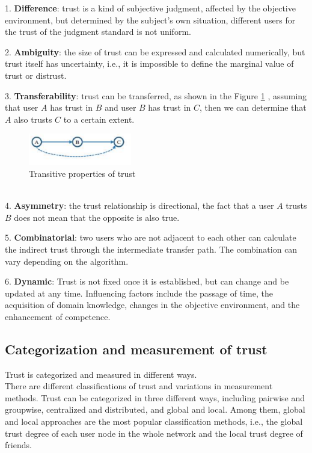 1.
\textbf{Difference}:
trust is a kind of subjective judgment, affected by the objective environment, but 
determined by the subject's own situation, different users for the trust of the judgment 
standard is not uniform\cite{b15}.

2.
\textbf{Ambiguity}:
the size of trust can be expressed and calculated numerically, but trust itself has 
uncertainty, i.e., it is impossible to define the marginal value of trust or distrust\cite{b15}.

3.
\textbf{Transferability}:
trust can be transferred, as shown in the Figure \ref{Fig.2: Transitive properties of trust}
, assuming that user $A$ has 
trust in $B$ and user $B$ has trust in $C$, then we can determine that $A$ also trusts 
$C$ to a certain extent\cite{b15}.

\begin{figure}[H] %
    \centering %
    \includegraphics[width=0.4\textwidth]{figures/relation.png} %
    \caption{Transitive properties of trust} %
    \label{Fig.2: Transitive properties of trust} %
    \end{figure}
\\

4.
\textbf{Asymmetry}:
the trust relationship is directional, the fact that a user $A$ trusts $B$ does not mean 
that the opposite is also true\cite{b15}.

5.
\textbf{Combinatorial}:
two users who are not adjacent to each other can calculate the indirect trust through 
the intermediate transfer path. The combination can vary depending on the algorithm\cite{b15}.

6.
\textbf{Dynamic}:
Trust is not fixed once it is established, but can change and be updated at any time. 
Influencing factors include the passage of time, the acquisition of domain knowledge, 
changes in the objective environment, and the enhancement of competence\cite{b15}.

\subsection{Categorization and measurement of trust}
Trust is categorized and measured in different ways.
\\
There are different classifications of trust and variations in measurement methods\cite{b28, b29}. 
Trust can be categorized in three different ways, including pairwise and groupwise, 
centralized and distributed, and global and local. Among them, global and local approaches 
are the most popular classification methods, i.e., the global trust degree of each user 
node in the whole network and the local trust degree of friends.

